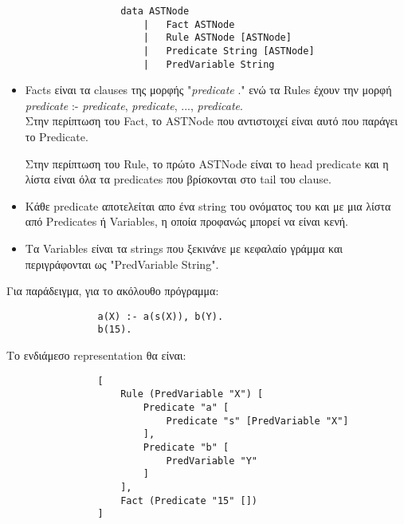 \documentclass[10pt]{article}
\begin{document}
\begin{verbatim}
                    data ASTNode
                        |   Fact ASTNode
                        |   Rule ASTNode [ASTNode]
                        |   Predicate String [ASTNode]
                        |   PredVariable String
\end{verbatim}

\begin{itemize}

\item Facts είναι τα clauses της μορφής "\textit{predicate} ." ενώ τα Rules έχουν την μορφή\\


\textit{predicate}  :- \textit{predicate}, \textit{predicate}, ..., \textit{predicate}.\\ 



Στην περίπτωση του Fact, το ASTNode που αντιστοιχεί είναι αυτό που παράγει το Predicate. 

Στην περίπτωση του Rule, το πρώτο ASTNode είναι το head predicate και η λίστα είναι όλα τα predicates που βρίσκονται στο tail του clause.

\item Κάθε predicate αποτελείται απο ένα string του ονόματος του και με μια λίστα από Predicates ή Variables, η οποία προφανώς μπορεί να είναι κενή.

\item Τα Variables είναι τα strings που ξεκινάνε με κεφαλαίο γράμμα και περιγράφονται ως "PredVariable String".

\end{itemize}

Για παράδειγμα, για το ακόλουθο πρόγραμμα:


\begin{verbatim}
                a(X) :- a(s(X)), b(Y).
                b(15).
\end{verbatim}

Το ενδιάμεσο representation θα είναι:

\begin{verbatim}
                [
                    Rule (PredVariable "X") [
                        Predicate "a" [
                            Predicate "s" [PredVariable "X"]
                        ],
                        Predicate "b" [
                            PredVariable "Y"
                        ]
                    ],
                    Fact (Predicate "15" [])
                ]

\end{verbatim}
\end{document}
